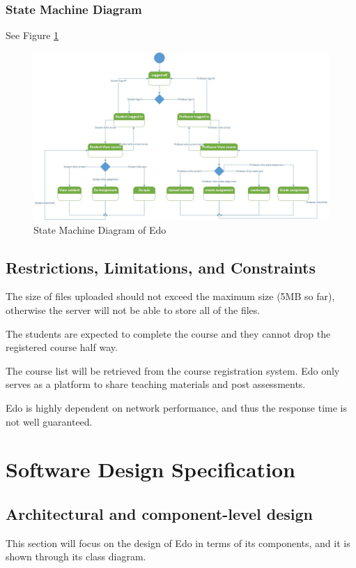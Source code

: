 \documentclass[paper=a4, fontsize=11pt]{scrartcl}
\numberwithin{equation}{section}		%
\numberwithin{figure}{section}			%
\numberwithin{table}{section}				%
\begin{document}
\subsubsection{State Machine Diagram}
See Figure \ref{state}
\begin{figure}[!ht]
	\begin{center}
		\includegraphics[width=\textwidth,height=\textheight,keepaspectratio]{state}
	\end{center}
	\caption{State Machine Diagram of Edo}
	\label{state}
\end{figure}






\subsection{Restrictions, Limitations, and Constraints}
The size of files uploaded should not exceed the maximum size (5MB so far), otherwise the server will not be able to store all of the files.

The students are expected to complete the course and they cannot drop the registered course half way.

The course list will be retrieved from the course registration system. Edo only serves as a platform to share teaching materials and post assessments.

Edo is highly dependent on network performance, and thus the response time is not well guaranteed.


\section{Software Design Specification}


\subsection{Architectural and component-level design}
This section will focus on the design of Edo in terms of its components, and it is shown through its class diagram.
\end{document}
